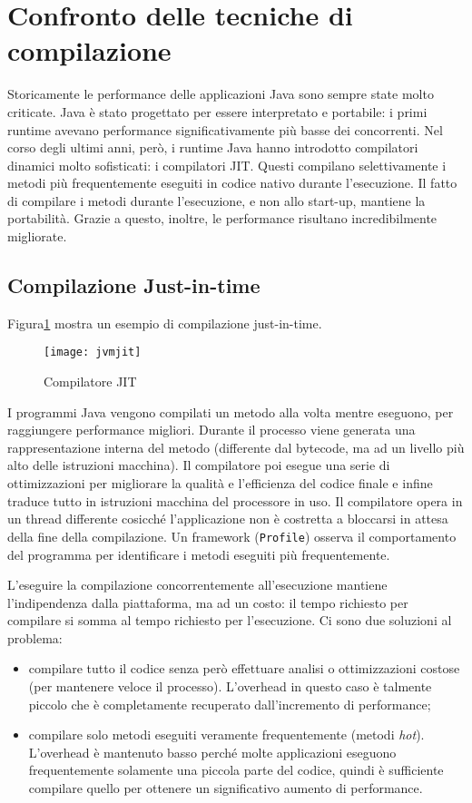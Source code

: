 \section{Confronto delle tecniche di compilazione}
Storicamente le performance delle applicazioni Java sono sempre state molto criticate. Java è stato progettato per essere interpretato e portabile: i primi runtime avevano performance significativamente più basse dei concorrenti. Nel corso degli ultimi anni, però, i runtime Java hanno introdotto compilatori dinamici molto sofisticati: i compilatori JIT. Questi compilano selettivamente i metodi più frequentemente eseguiti in codice nativo durante l'esecuzione. Il fatto di compilare i metodi durante l'esecuzione, e non allo start-up, mantiene la portabilità. Grazie a questo, inoltre, le performance risultano incredibilmente migliorate. 

\subsection{Compilazione Just-in-time}
Figura\ref{fig:jit} mostra un esempio di compilazione just-in-time. 
\begin{figure}
	\centering
	\texttt{[image: jvmjit]}
	\caption[Compilatore JIT]{Compilatore JIT}
	\label{fig:jit}
\end{figure}
I programmi Java vengono compilati un metodo alla volta mentre eseguono, per raggiungere performance migliori. Durante il processo viene generata una rappresentazione interna del metodo (differente dal bytecode, ma ad un livello più alto delle istruzioni macchina). Il compilatore poi esegue una serie di ottimizzazioni per migliorare la qualità e l'efficienza del codice finale e infine traduce tutto in istruzioni macchina del processore in uso. Il compilatore opera in un thread differente cosicché l'applicazione non è costretta a bloccarsi in attesa della fine della compilazione. Un framework (\texttt{Profile}) osserva il comportamento del programma per identificare i metodi eseguiti più frequentemente. 

L'eseguire la compilazione concorrentemente all'esecuzione mantiene l'indipendenza dalla piattaforma, ma ad un costo: il tempo richiesto per compilare si somma al tempo richiesto per l'esecuzione. Ci sono due soluzioni al problema:
\begin{itemize}
	\item compilare tutto il codice senza però effettuare analisi o ottimizzazioni costose (per mantenere veloce il processo). L'overhead in questo caso è talmente piccolo che è completamente recuperato dall'incremento di performance; 
	\item compilare solo metodi eseguiti veramente frequentemente (metodi \textit{hot}). L'overhead è mantenuto basso perché molte applicazioni eseguono frequentemente solamente una piccola parte del codice, quindi è sufficiente compilare quello per ottenere un significativo aumento di performance.
\end{itemize}

